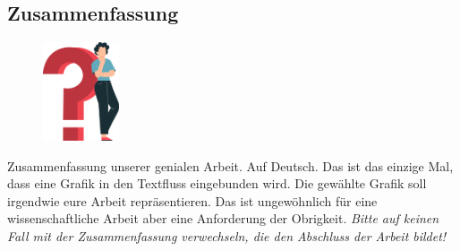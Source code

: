 \begin{spacing}{1}
    \chapter*{Zusammenfassung}
\end{spacing}
\begin{figure}
    \begin{center}
      \includegraphics[width=0.2\textwidth]{pics/question_mark.png}
    \end{center}
\end{figure}
Zusammenfassung unserer genialen Arbeit. Auf Deutsch.
Das ist das einzige Mal, dass eine Grafik in den Textfluss eingebunden wird.
Die gewählte Grafik soll irgendwie eure Arbeit repräsentieren.
Das ist ungewöhnlich für eine wissenschaftliche Arbeit aber eine Anforderung der Obrigkeit.
\emph{Bitte auf keinen Fall mit der Zusammenfassung verwechseln, die den Abschluss der Arbeit bildet!}
\lipsum[6]
